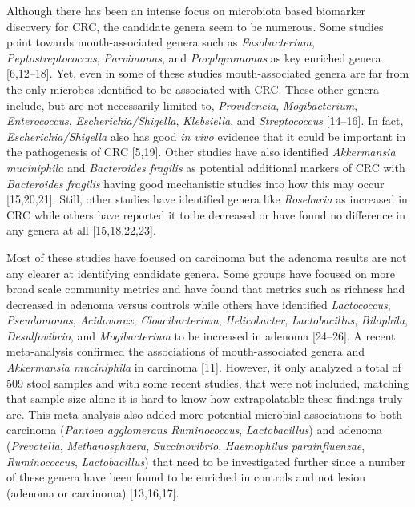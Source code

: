 \documentclass[12pt,]{article}
\begin{document}
Although there has been an intense focus on microbiota based biomarker
discovery for CRC, the candidate genera seem to be numerous. Some
studies point towards mouth-associated genera such as
\emph{Fusobacterium}, \emph{Peptostreptococcus}, \emph{Parvimonas}, and
\emph{Porphyromonas} as key enriched genera {[}6,12--18{]}. Yet, even in
some of these studies mouth-associated genera are far from the only
microbes identified to be associated with CRC. These other genera
include, but are not necessarily limited to, \emph{Providencia},
\emph{Mogibacterium}, \emph{Enterococcus}, \emph{Escherichia/Shigella},
\emph{Klebsiella}, and \emph{Streptococcus} {[}14--16{]}. In fact,
\emph{Escherichia/Shigella} also has good \emph{in vivo} evidence that
it could be important in the pathogenesis of CRC {[}5,19{]}. Other
studies have also identified \emph{Akkermansia muciniphila} and
\emph{Bacteroides fragilis} as potential additional markers of CRC with
\emph{Bacteroides fragilis} having good mechanistic studies into how
this may occur {[}15,20,21{]}. Still, other studies have identified
genera like \emph{Roseburia} as increased in CRC while others have
reported it to be decreased or have found no difference in any genera at
all {[}15,18,22,23{]}.

Most of these studies have focused on carcinoma but the adenoma results
are not any clearer at identifying candidate genera. Some groups have
focused on more broad scale community metrics and have found that
metrics such as richness had decreased in adenoma versus controls while
others have identified \emph{Lactococcus}, \emph{Pseudomonas},
\emph{Acidovorax}, \emph{Cloacibacterium}, \emph{Helicobacter},
\emph{Lactobacillus}, \emph{Bilophila}, \emph{Desulfovibrio}, and
\emph{Mogibacterium} to be increased in adenoma {[}24--26{]}. A recent
meta-analysis confirmed the associations of mouth-associated genera and
\emph{Akkermansia muciniphila} in carcinoma {[}11{]}. However, it only
analyzed a total of 509 stool samples and with some recent studies, that
were not included, matching that sample size alone it is hard to know
how extrapolatable these findings truly are. This meta-analysis also
added more potential microbial associations to both carcinoma
(\emph{Pantoea agglomerans} \emph{Ruminococcus}, \emph{Lactobacillus})
and adenoma (\emph{Prevotella}, \emph{Methanosphaera},
\emph{Succinovibrio}, \emph{Haemophilus parainfluenzae},
\emph{Ruminococcus}, \emph{Lactobacillus}) that need to be investigated
further since a number of these genera have been found to be enriched in
controls and not lesion (adenoma or carcinoma) {[}13,16,17{]}.
\end{document}
